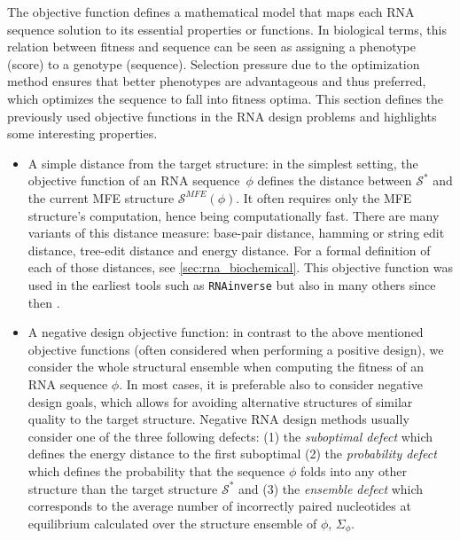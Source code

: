 The objective function defines a mathematical model that maps each \ac{RNA} sequence solution to its essential properties or functions. In biological terms, this relation between fitness and sequence can be seen as assigning a phenotype (score) to a genotype (sequence). Selection pressure due to the optimization method ensures that better phenotypes are advantageous and thus preferred, which optimizes the sequence to fall into fitness optima. This section defines the previously used objective functions in the \ac{RNA} design problems and highlights some interesting properties.
\begin{itemize}
	\item A simple distance from the target structure: in the simplest setting, the objective function of an \ac{RNA} sequence~\(\phi\) defines the distance between $\mathcal{S}^*$ and the current \ac{MFE} structure $\mathcal{S}^{MFE} (\phi)$. It often requires only the \ac{MFE} structure's computation, hence being computationally fast. There are many variants of this distance measure: base-pair distance, hamming or string edit distance, tree-edit distance and energy distance. For a formal definition of each of those distances, see \autoref{sec:rna_biochemical}. This objective function was used in the earliest tools such as \texttt{RNAinverse} \cite{hofacker1994fast} but also in many others since then \cite{andronescu2004new, busch2006info, gao2010inverse}. 
	
	\item A negative design objective function: in contrast to the above mentioned objective functions (often considered when performing a positive design), we consider the whole structural ensemble when computing the fitness of an \ac{RNA} sequence $\phi$. In most cases, it is preferable also to consider negative design goals, which allows for avoiding alternative structures of similar quality to the target structure.
	Negative \ac{RNA} design methods usually consider one of the three following defects: (1) the \textit{suboptimal defect} \cite{hofacker1994fast, flamm2001design, dirks2003partition, zadeh2011nupack} which defines the energy distance to the first suboptimal (2) the \textit{probability defect} \cite{zadeh2011nupack, hofacker1994fast} which defines the probability that the sequence $\phi$ folds into any other structure than the target structure $\mathcal{S}^*$  and (3) the \textit{ensemble defect} \cite{zadeh2011nupack} which corresponds to the average number of incorrectly paired nucleotides at equilibrium calculated over the structure ensemble of $\phi$, $\Sigma_{\phi}$. 
	

\end{itemize}
